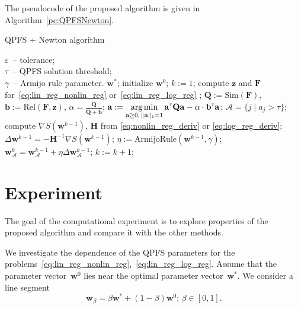 \documentclass[
11pt,%
tightenlines,%
twoside,%
onecolumn,%
nofloats,%
nobibnotes,%
nofootinbib,%
superscriptaddress,%
noshowpacs,%
centertags]%
{revtex4}
\newcommand{\ba}{\mathbf{a}}
\newcommand{\bb}{\mathbf{b}}
\newcommand{\bw}{\mathbf{w}}
\newcommand{\bz}{\mathbf{z}}
\newcommand{\cA}{\mathcal{A}}
\newcommand{\bQ}{\mathbf{Q}}
\newcommand{\bH}{\mathbf{H}}
\newcommand{\bF}{\mathbf{F}}
\newcommand{\T}{{\text{\tiny\sffamily\upshape\mdseries T}}}
\newcommand{\argmin}{\mathop{\arg \min}\limits}
\begin{document}
The pseudocode of the proposed algorithm is given in Algorithm~\ref{pc:QPFSNewton}.

\begin{algorithm}
	\caption{QPFS + Newton algorithm}
	\label{pc:QPFSNewton}
	\begin{algorithmic}
		\REQUIRE $\varepsilon$~-- tolerance;\\
		\hspace{1.07cm}$\tau$~-- QPFS solution threshold;\\
		\hspace{1.07cm}$\gamma$~-- Armijo rule parameter.
		\ENSURE $\bw^*$;
		\STATE  initialize $\bw^0$;
		\STATE $k := 1$;
		\REPEAT
		\STATE compute $\bz$ and $\bF$ for~\eqref{eq:lin_reg_nonlin_reg} or~\eqref{eq:lin_reg_log_reg} ;
		\vspace{0.1cm}
		\STATE $\bQ := \text{Sim} (\bF)$, $\bb := \text{Rel}(\bF, \bz)$, $\alpha = \frac{\overline{\bQ}}{\overline{\bQ} + \overline{\bb}}$;
		\vspace{0.1cm}
		\STATE $\ba := \argmin_{\ba \geq 0, \, \|\ba\|_1=1}\ba^{\T} \bQ \ba - \alpha \cdot \mathbf{b}^{\T} \ba$;
		\vspace{0.1cm}
		\STATE $\cA = \{j \mid a_j > \tau\}$;
		\vspace{0.1cm}
		\STATE compute $\nabla S(\bw^{k-1})$, $\bH$ from \eqref{eq:nonlin_reg_deriv} or \eqref{eq:log_reg_deriv};
		\vspace{0.1cm}
		\STATE $\Delta \bw^{k-1} = - \bH^{-1} \nabla S(\bw^{k-1})$;
		\vspace{0.1cm}
		\STATE $\eta := \text{ArmijoRule}(\bw^{k-1}, \gamma)$;
		\vspace{0.1cm}
		\STATE $\bw_{\cA}^k = \bw_{\cA}^{k - 1} + \eta \Delta \bw_{\cA}^{k - 1}$;
		\vspace{0.1cm}
		\STATE $k := k + 1$;
		\vspace{0.1cm}
		\UNTIL{$\frac{\| \bw^k - \bw^{k-1} \|}{\| \bw^k \|} < \varepsilon$}
	\end{algorithmic}
\end{algorithm}



\section{Experiment}
The goal of the computational experiment is to explore properties of the proposed algorithm and compare it with the other methods. 

We investigate the dependence of the QPFS parameters for the problems~\eqref{eq:lin_reg_nonlin_reg},~\eqref{eq:lin_reg_log_reg}. 
Assume that the parameter vector~$\bw^0$ lies near the optimal parameter vector~$\bw^*$. 
We consider a line segment
\[
\bw_{\beta} = \beta \bw^* + (1 - \beta) \bw^0; \, \beta \in [0, 1] .
\]
\end{document}
